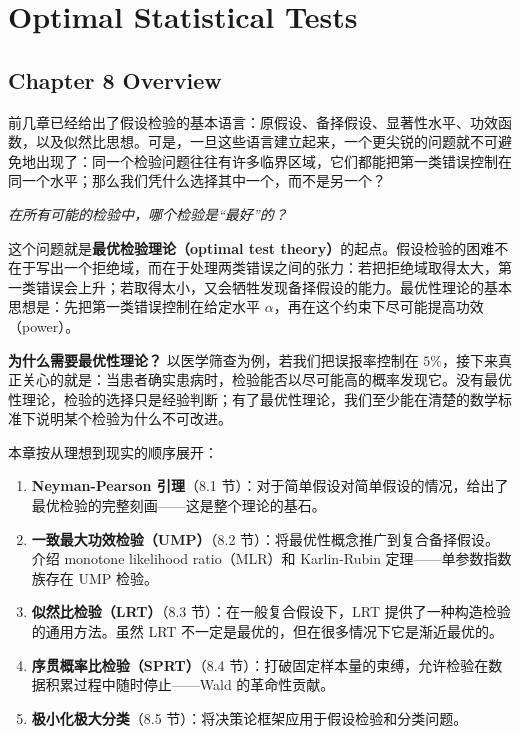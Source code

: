 
\chapter{Optimal Statistical Tests}\label{chap:optimal-tests}

\section*{Chapter 8 Overview}

前几章已经给出了假设检验的基本语言：原假设、备择假设、显著性水平、功效函数，以及似然比思想。可是，一旦这些语言建立起来，一个更尖锐的问题就不可避免地出现了：同一个检验问题往往有许多临界区域，它们都能把第一类错误控制在同一个水平；那么我们凭什么选择其中一个，而不是另一个？

\begin{center}
\textit{在所有可能的检验中，哪个检验是``最好''的？}
\end{center}

这个问题就是\textbf{最优检验理论（optimal test theory）}的起点。假设检验的困难不在于写出一个拒绝域，而在于处理两类错误之间的张力：若把拒绝域取得太大，第一类错误会上升；若取得太小，又会牺牲发现备择假设的能力。最优性理论的基本思想是：先把第一类错误控制在给定水平 $\alpha$，再在这个约束下尽可能提高功效（power）。

\textbf{为什么需要最优性理论？} 以医学筛查为例，若我们把误报率控制在 $5\%$，接下来真正关心的就是：当患者确实患病时，检验能否以尽可能高的概率发现它。没有最优性理论，检验的选择只是经验判断；有了最优性理论，我们至少能在清楚的数学标准下说明某个检验为什么不可改进。

本章按从理想到现实的顺序展开：

\begin{enumerate}
\item \textbf{Neyman-Pearson 引理}（8.1 节）：对于简单假设对简单假设的情况，给出了最优检验的完整刻画——这是整个理论的基石。
\item \textbf{一致最大功效检验（UMP）}（8.2 节）：将最优性概念推广到复合备择假设。介绍 monotone likelihood ratio（MLR）和 Karlin-Rubin 定理——单参数指数族存在 UMP 检验。
\item \textbf{似然比检验（LRT）}（8.3 节）：在一般复合假设下，LRT 提供了一种构造检验的通用方法。虽然 LRT 不一定是最优的，但在很多情况下它是渐近最优的。
\item \textbf{序贯概率比检验（SPRT）}（8.4 节）：打破固定样本量的束缚，允许检验在数据积累过程中随时停止——Wald 的革命性贡献。
\item \textbf{极小化极大分类}（8.5 节）：将决策论框架应用于假设检验和分类问题。
\end{enumerate}

